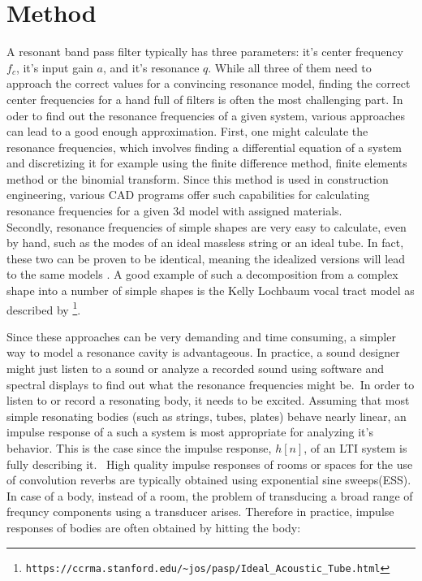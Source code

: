 \chapter{Method}
\label{sec:Method}





A resonant band pass filter typically has three parameters: it's center frequency \(f_c\), it's input gain \(a\), and it's resonance \(q\). While all three of them need to approach the correct values for a convincing resonance model, finding the correct center frequencies for a hand full of filters is often the most challenging part. In oder to find out the resonance frequencies of a given system, various approaches can lead to a good enough approximation. First, one might calculate the resonance frequencies, which involves finding a differential equation of a system and discretizing it for example using the finite difference method, finite elements method or the binomial transform. Since this method is used in construction engineering, various CAD programs offer such capabilities for calculating resonance frequencies for a given 3d model with assigned materials. \\
Secondly, resonance frequencies of simple shapes are very easy to calculate, even by hand, such as the modes of an ideal massless string or an ideal tube. In fact, these two can be proven to be identical, meaning the idealized versions will lead to the same models \citep[see][p. 230]{cook_real_2002}. A good example of such a decomposition from a complex shape into a number of simple shapes is the Kelly Lochbaum vocal tract model as described by \citep{smith_physical_2010}\footnote{\texttt{https://ccrma.stanford.edu/\~{}jos/pasp/Ideal\_Acoustic\_Tube.html}}. 


Since these approaches can be very demanding and time consuming, a simpler way to model a resonance cavity is advantageous. In practice, a sound designer might just listen to a sound or analyze a recorded sound using software and spectral displays to find out what the resonance frequencies might be.\
In order to listen to or record a resonating body, it needs to be excited. Assuming that most simple resonating bodies (such as strings, tubes, plates) behave nearly linear, an impulse response of a such a system is most appropriate for analyzing it's behavior. This is the case since the impulse response, \(h[n]\), of an LTI system is fully describing it. \
High quality impulse responses of rooms or spaces for the use of convolution reverbs are typically obtained using exponential sine sweeps(ESS). In case of a body, instead of a room, the problem of transducing a broad range of frequncy components using a transducer arises. Therefore in practice, impulse responses of bodies are often obtained by hitting the body:

